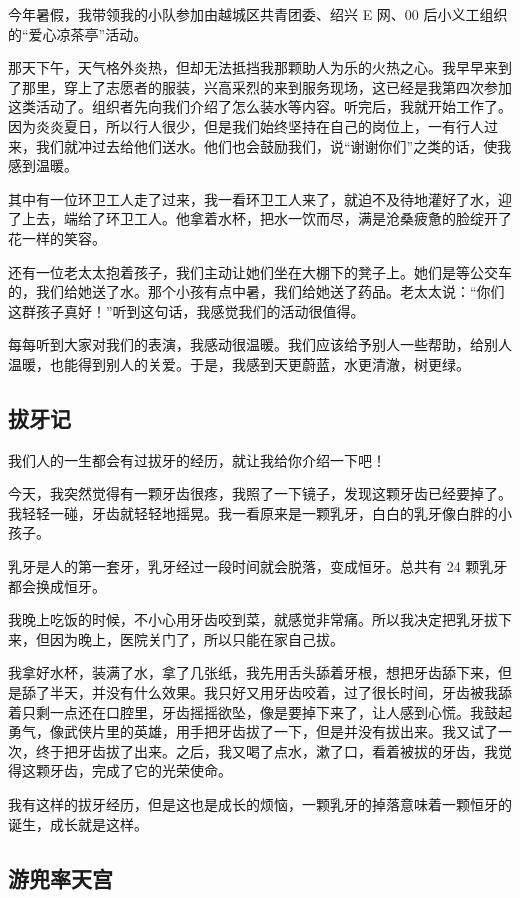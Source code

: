 \documentclass[UTF8,a4paper,titlepage,twoside,10.5pt]{article}
\begin{document}
今年暑假，我带领我的小队参加由越城区共青团委、绍兴 E 网、00 后小义工组织的“爱心凉茶亭”活动。

那天下午，天气格外炎热，但却无法抵挡我那颗助人为乐的火热之心。我早早来到了那里，穿上了志愿者的服装，兴高采烈的来到服务现场，这已经是我第四次参加这类活动了。组织者先向我们介绍了怎么装水等内容。听完后，我就开始工作了。因为炎炎夏日，所以行人很少，但是我们始终坚持在自己的岗位上，一有行人过来，我们就冲过去给他们送水。他们也会鼓励我们，说“谢谢你们”之类的话，使我感到温暖。

其中有一位环卫工人走了过来，我一看环卫工人来了，就迫不及待地灌好了水，迎了上去，端给了环卫工人。他拿着水杯，把水一饮而尽，满是沧桑疲惫的脸绽开了花一样的笑容。

还有一位老太太抱着孩子，我们主动让她们坐在大棚下的凳子上。她们是等公交车的，我们给她送了水。那个小孩有点中暑，我们给她送了药品。老太太说：“你们这群孩子真好！”听到这句话，我感觉我们的活动很值得。

每每听到大家对我们的表演，我感动很温暖。我们应该给予别人一些帮助，给别人温暖，也能得到别人的关爱。于是，我感到天更蔚蓝，水更清澈，树更绿。

\subsection{拔牙记}
\label{sec:orgf450015}

我们人的一生都会有过拔牙的经历，就让我给你介绍一下吧！

今天，我突然觉得有一颗牙齿很疼，我照了一下镜子，发现这颗牙齿已经要掉了。我轻轻一碰，牙齿就轻轻地摇晃。我一看原来是一颗乳牙，白白的乳牙像白胖的小孩子。

乳牙是人的第一套牙，乳牙经过一段时间就会脱落，变成恒牙。总共有 24 颗乳牙都会换成恒牙。

我晚上吃饭的时候，不小心用牙齿咬到菜，就感觉非常痛。所以我决定把乳牙拔下来，但因为晚上，医院关门了，所以只能在家自己拔。

我拿好水杯，装满了水，拿了几张纸，我先用舌头舔着牙根，想把牙齿舔下来，但是舔了半天，并没有什么效果。我只好又用牙齿咬着，过了很长时间，牙齿被我舔着只剩一点还在口腔里，牙齿摇摇欲坠，像是要掉下来了，让人感到心慌。我鼓起勇气，像武侠片里的英雄，用手把牙齿拔了一下，但是并没有拔出来。我又试了一次，终于把牙齿拔了出来。之后，我又喝了点水，漱了口，看着被拔的牙齿，我觉得这颗牙齿，完成了它的光荣使命。

我有这样的拔牙经历，但是这也是成长的烦恼，一颗乳牙的掉落意味着一颗恒牙的诞生，成长就是这样。

\subsection{游兜率天宫}
\label{sec:org41eb876}
\end{document}
